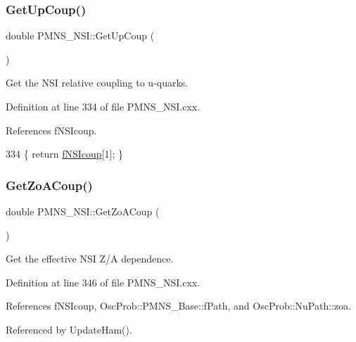 \subsubsection{\texorpdfstring{Get\+Up\+Coup()}{GetUpCoup()}}
{\footnotesize\ttfamily double P\+M\+N\+S\+\_\+\+N\+S\+I\+::\+Get\+Up\+Coup (\begin{DoxyParamCaption}{ }\end{DoxyParamCaption})\hspace{0.3cm}{\ttfamily [virtual]}}

Get the N\+SI relative coupling to u-\/quarks. 

Definition at line 334 of file P\+M\+N\+S\+\_\+\+N\+S\+I.\+cxx.



References f\+N\+S\+Icoup.


\begin{DoxyCode}
334 \{ \textcolor{keywordflow}{return} \hyperlink{classOscProb_1_1PMNS__NSI_a1ac51957bbc4cec9fcfd8f816491cc95}{fNSIcoup}[1]; \}
\end{DoxyCode}
\mbox{\label{classOscProb_1_1PMNS__NSI_a42b2db6f2f42dbca7545a10d101a7950}} 
\subsubsection{\texorpdfstring{Get\+Zo\+A\+Coup()}{GetZoACoup()}}
{\footnotesize\ttfamily double P\+M\+N\+S\+\_\+\+N\+S\+I\+::\+Get\+Zo\+A\+Coup (\begin{DoxyParamCaption}{ }\end{DoxyParamCaption})\hspace{0.3cm}{\ttfamily [virtual]}}

Get the effective N\+SI Z/A dependence. 

Definition at line 346 of file P\+M\+N\+S\+\_\+\+N\+S\+I.\+cxx.



References f\+N\+S\+Icoup, Osc\+Prob\+::\+P\+M\+N\+S\+\_\+\+Base\+::f\+Path, and Osc\+Prob\+::\+Nu\+Path\+::zoa.



Referenced by Update\+Ham().



